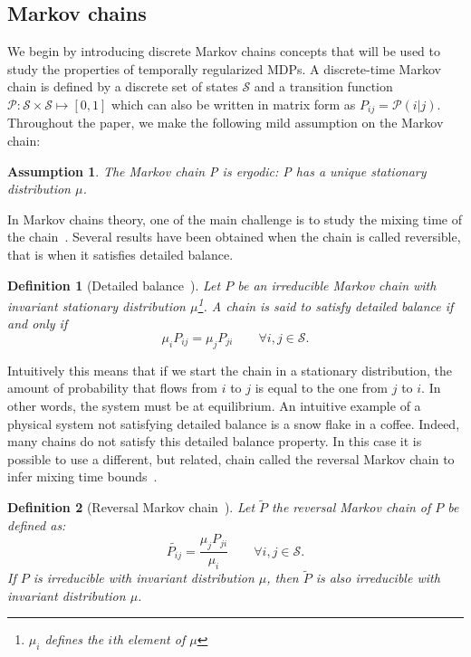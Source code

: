 \documentclass{article}
\newtheorem{assumption}{Assumption}
\newtheorem{definition}{Definition}
\newcommand{\s}{\mathcal{S}}
\newcommand{\p}{\mathcal{P}}
\begin{document}
\subsection{Markov chains}
We begin by introducing discrete Markov chains concepts that will be used to study the properties of temporally regularized MDPs. A discrete-time Markov chain \citep{levin2017markov} is defined by a discrete set of states $\s$ and a transition function $\p : \s \times \s \mapsto [0,1]$ which can also be written in matrix form as $P_{ij} = \p(i|j)$.
Throughout the paper, we make the following mild assumption on the Markov chain:
\begin{assumption}
The Markov chain P is ergodic: P has a unique stationary distribution $\mu$.
\end{assumption}
In Markov chains theory, one of the main challenge is to study the mixing time of the chain~\citep{levin2017markov}. Several results have been obtained when the chain is called reversible, that is when it satisfies detailed balance.
\begin{definition}[Detailed balance~\citep{kemeny1976finite}]
Let $P$ be an irreducible Markov chain with invariant stationary distribution $\mu$\footnote{$\mu_i$ defines the $i$th element of $\mu$}. A chain is said to satisfy detailed balance if and only if
\begin{equation}
    \mu_i P_{ij} = \mu_j P_{ji} \qquad \forall i,j \in \s.
\end{equation}
\end{definition}
Intuitively this means that if we start the chain in a stationary distribution, the amount of probability that flows from $i$ to $j$ is equal to the one from $j$ to $i$. In other words, the system must be at equilibrium. An intuitive example of a physical system not satisfying detailed balance is a snow flake in a coffee.
Indeed, many chains do not satisfy this detailed balance property. In this case it is possible to use a different, but related, chain called the reversal Markov chain to infer mixing time bounds~\citep{chung2012chernoff}.
\begin{definition}[Reversal Markov chain~\citep{kemeny1976finite}]
Let $\widetilde{P}$ the reversal Markov chain of $P$ be defined as:
\begin{equation}
    \widetilde{P_{ij}} = \frac{\mu_j P_{ji}}{\mu_i} \qquad \forall i,j \in \s.
\end{equation}
If $P$ is irreducible with invariant distribution $\mu$, then $\widetilde{P}$ is also irreducible with invariant distribution $\mu$.
\end{definition}
\end{document}
